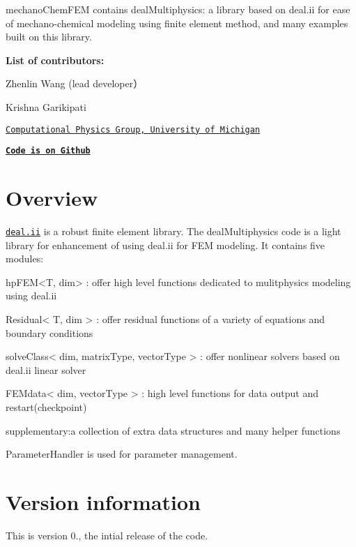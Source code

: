 mechano\+Chem\+F\+EM contains deal\+Multiphysics\+: a library based on deal.\+ii for ease of mechano-\/chemical modeling using finite element method, and many examples built on this library.

{\bfseries List of contributors\+:}~\newline


Zhenlin Wang (lead developer）~\newline


Krishna Garikipati~\newline


\href{http://umich.edu/~compphys/index.html}{\tt Computational Physics Group, University of Michigan}

\href{https://github.com/mechanoChem/mechanoChemFEM}{\tt {\bfseries Code is on Github}}

\section*{{\bfseries Overview}~\newline
 }

\href{http://www.dealii.org}{\tt deal.\+ii} is a robust finite element library. The deal\+Multiphysics code is a light library for enhancement of using deal.\+ii for F\+EM modeling. It contains five modules\+:

\begin{DoxyVerb}hpFEM<T, dim> : offer high level functions dedicated to mulitphysics modeling using deal.ii

Residual< T, dim > : offer residual functions of a variety of equations and boundary conditions

solveClass< dim, matrixType, vectorType > : offer nonlinear solvers based on deal.ii linear solver

FEMdata< dim, vectorType > : high level functions for data output and restart(checkpoint)

supplementary:a collection of extra data structures and many helper functions
\end{DoxyVerb}


Parameter\+Handler is used for parameter management.

\section*{{\bfseries Version information}~\newline
 }

This is version 0., the intial release of the code.

